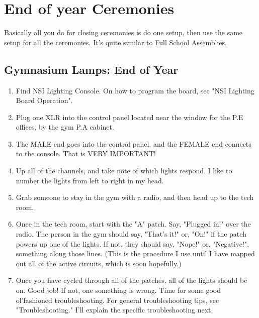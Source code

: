 \documentclass[11pt,a4paper]{book}
\begin{document}
\chapter{End of year Ceremonies}
Basically all you do for closing ceremonies is do one setup, then use the same setup for all the ceremonies. It's quite similar to Full School Assemblies. 
\section{Gymnasium Lamps: End of Year}
\begin{enumerate}
\item Find NSI Lighting Console. On how to program the board, see "NSI Lighting Board Operation".
\item Plug one XLR into the control panel located near the window for the P.E offices, by the gym P.A cabinet.
\item The MALE end goes into the control panel, and the FEMALE end connects to the console. That is VERY IMPORTANT!
\item Up all of the channels, and take note of which lights respond. I like to number the lights from left to right in my head.
\item Grab someone to stay in the gym with a radio, and then head up to the tech room.
\item Once in the tech room, start with the "A" patch. Say, "Plugged in!" over the radio. The person in the gym should say, "That's it!" or, "On!" if the patch powers up one of the lights. If not, they should say, "Nope!" or, "Negative!", something along those lines. (This is the procedure I use until I have mapped out all of the active circuits, which is soon hopefully.)
\item Once you have cycled through all of the patches, all of the lights should be on. Good job! If not, one something is wrong. Time for some good ol'fashioned troubleshooting. For general troubleshooting tips, see "Troubleshooting." I'll explain the specific troubleshooting next.
\end{enumerate}
\end{document}
